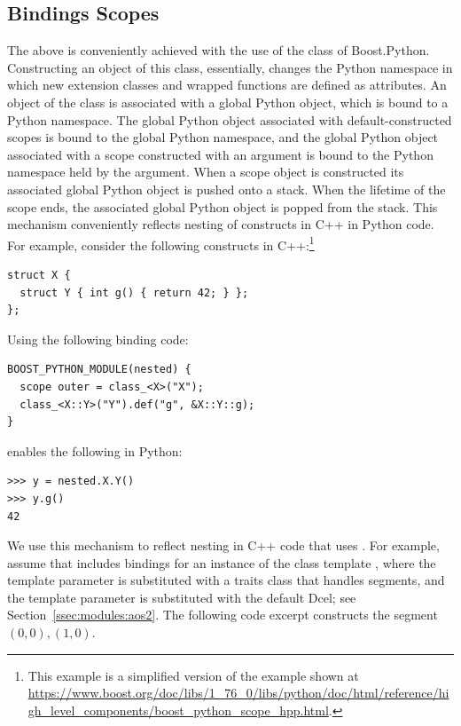 \subsection{Bindings Scopes}
\label{sec:gen:scopes}
The above is conveniently achieved with the use of the  class of Boost.Python. Constructing an object of this class, essentially, changes the Python namespace in which new extension classes and wrapped functions are defined as attributes.  An object of the  class is associated with a global Python object, which is bound to a Python namespace. The global Python object associated with default-constructed scopes is bound to the global Python namespace, and the global Python object associated with a scope constructed with an argument is bound to the Python namespace held by the argument. When a scope object is constructed its associated global Python object is pushed onto a stack. When the lifetime of the scope ends, the associated global Python object is popped from the stack. This mechanism conveniently reflects nesting of constructs in C++ in Python code. For example, consider the following constructs in C++:\footnote{This example is a simplified version of the example shown at \url{https://www.boost.org/doc/libs/1_76_0/libs/python/doc/html/reference/high_level_components/boost_python_scope_hpp.html}.}

\begin{lstlisting}[style=cppNumberedStyle]
struct X {
  struct Y { int g() { return 42; } };
};
\end{lstlisting}

\noindent
Using the following binding code:

\begin{lstlisting}[style=cppNumberedStyle]
BOOST_PYTHON_MODULE(nested) {
  scope outer = class_<X>("X");
  class_<X::Y>("Y").def("g", &X::Y::g);
}
\end{lstlisting}

\noindent
enables the following in Python:

\begin{lstlisting}[style=pythonStyle]
>>> y = nested.X.Y()
>>> y.g()
42
\end{lstlisting}

\noindent
We use this mechanism to reflect nesting in C++ code that uses \cgal. For example, assume that  includes bindings for an instance of the class template , where the  template parameter is substituted with a traits class that handles segments, and the  template parameter is substituted with the default Dcel; see Section~\ref{ssec:modules:aos2}. The following code excerpt constructs the segment $(0,0),(1,0)$.

